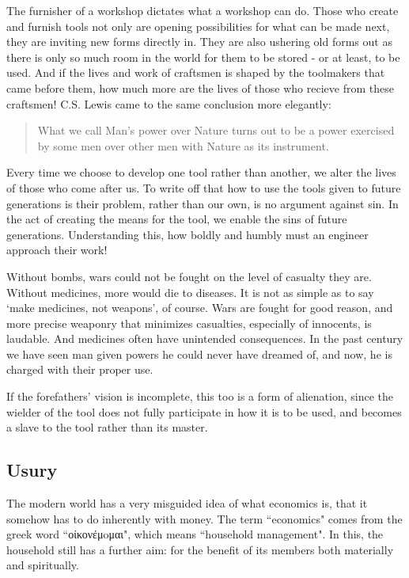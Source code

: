 \documentclass[letterpaper]{article}
\begin{document}
The furnisher of a workshop dictates what a workshop can do. Those who create and furnish tools not only are opening possibilities for what can be made next, they are inviting new forms directly in. They are also ushering old forms out as there is only so much room in the world for them to be stored - or at least, to be used. And if the lives and work of craftsmen is shaped by the toolmakers that came before them, how much more are the lives of those who recieve from these craftsmen! C.S. Lewis came to the same conclusion more elegantly:

\begin{quote}
  What we call Man's power over Nature turns out to be a power exercised by some men over other men with Nature as its instrument.
\end{quote}

Every time we choose to develop one tool rather than another, we alter the lives of those who come after us. To write off that how to use the tools given to future generations is their problem, rather than our own, is no argument against sin. In the act of creating the means for the tool, we enable the sins of future generations. Understanding this, how boldly and humbly must an engineer approach their work!

Without bombs, wars could not be fought on the level of casualty they are. Without medicines, more would die to diseases. It is not as simple as to say `make medicines, not weapons', of course. Wars are fought for good reason, and more precise weaponry that minimizes casualties, especially of innocents, is laudable. And medicines often have unintended consequences. In the past century we have seen man given powers he could never have dreamed of, and now, he is charged with their proper use.

If the forefathers' vision is incomplete, this too is a form of alienation, since the wielder of the tool does not fully participate in how it is to be used, and becomes a slave to the tool rather than its master.

\subsection{Usury}

The modern world has a very misguided idea of what economics is, that it somehow has to do inherently with money. The term ``economics" comes from the greek word ``οίκονέμoμαι", which means ``household management". In this, the household still has a further aim: for the benefit of its members both materially and spiritually.
\end{document}
